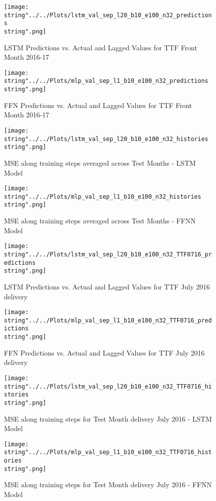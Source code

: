 \begin{figure}
  \centering
\texttt{[image: \\string"../../Plots/lstm\_val\_sep\_l20\_b10\_e100\_n32\_predictions\\string".png]}
  \caption{LSTM Predictions vs. Actual and Lagged Values for TTF Front Month 2016-17}\label{fig:lstm_val_sep_l20_b10_e100_n32_predictions}
\end{figure}
\begin{figure}
  \centering
\texttt{[image: \\string"../../Plots/mlp\_val\_sep\_l1\_b10\_e100\_n32\_predictions\\string".png]}
  \caption{FFN Predictions vs. Actual and Lagged Values for TTF Front Month 2016-17}\label{fig:mlp_val_sep_l1_b10_e100_n32_predictions}
\end{figure}

\begin{figure}
  \centering
\texttt{[image: \\string"../../Plots/lstm\_val\_sep\_l20\_b10\_e100\_n32\_histories\\string".png]}
  \caption{MSE along training steps averaged across Test Months - LSTM Model}\label{fig:lstm_val_sep_l20_b10_e100_n32_histories}
\end{figure}
\begin{figure}
  \centering
\texttt{[image: \\string"../../Plots/mlp\_val\_sep\_l1\_b10\_e100\_n32\_histories\\string".png]}
  \caption{MSE along training steps averaged across Test Months - FFNN Model}\label{fig:mlp_val_sep_l20_b10_e100_n32_histories}
\end{figure}


\begin{figure}
  \centering
\texttt{[image: \\string"../../Plots/lstm\_val\_sep\_l20\_b10\_e100\_n32\_TTF0716\_predictions\\string".png]}
  \caption{LSTM Predictions vs. Actual and Lagged Values for TTF July 2016 delivery}\label{fig:lstm_val_sep_l20_b10_e100_n32_TTF0716_predictions}
\end{figure}
\begin{figure}
  \centering
\texttt{[image: \\string"../../Plots/mlp\_val\_sep\_l1\_b10\_e100\_n32\_TTF0716\_predictions\\string".png]}
  \caption{FFN Predictions vs. Actual and Lagged Values for TTF July 2016 delivery}\label{fig:mlp_val_sep_l1_b10_e100_n32_TTF0716_predictions}
\end{figure}

\begin{figure}
  \centering
\texttt{[image: \\string"../../Plots/lstm\_val\_sep\_l20\_b10\_e100\_n32\_TTF0716\_histories\\string".png]}
  \caption{MSE along training steps for Test Month delivery July 2016 - LSTM Model}\label{fig:lstm_val_sep_l20_b10_e100_n32_TTF0716_histories}
\end{figure}
\begin{figure}
  \centering
\texttt{[image: \\string"../../Plots/mlp\_val\_sep\_l1\_b10\_e100\_n32\_TTF0716\_histories\\string".png]}
  \caption{MSE along training steps for Test Month delivery July 2016 - FFNN Model}\label{fig:mlp_val_sep_l20_b10_e100_n32_TTF0716_histories}
\end{figure}

